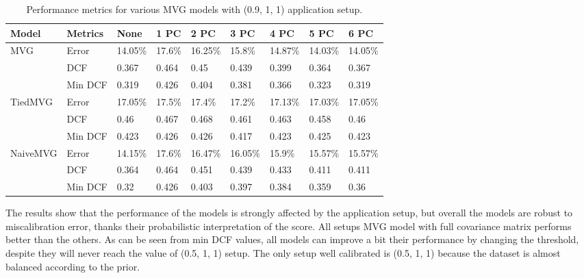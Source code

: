 \documentclass{article}
\begin{document}
\begin{table}[ht]
    \centering
    \begin{tabularx}{\textwidth}{ll*{7}{X}}
        \toprule
        \textbf{Model} & \textbf{Metrics} & \textbf{None} & \textbf{1 PC} & \textbf{2 PC} & \textbf{3 PC} & \textbf{4 PC} & \textbf{5 PC} & \textbf{6 PC} \\
        \midrule
        \multirow{3}{*}{MVG} & Error & 14.05\% & 17.6\% & 16.25\% & 15.8\% & 14.87\% & 14.03\% & 14.05\% \\
                              & DCF & 0.367 & 0.464 & 0.45 & 0.439 & 0.399 & 0.364 & 0.367 \\
                              & Min DCF & 0.319 & 0.426 & 0.404 & 0.381 & 0.366 & 0.323 & 0.319 \\
        \midrule
        \multirow{3}{*}{TiedMVG} & Error & 17.05\% & 17.5\% & 17.4\% & 17.2\% & 17.13\% & 17.03\% & 17.05\% \\
                                 & DCF & 0.46 & 0.467 & 0.468 & 0.461 & 0.463 & 0.458 & 0.46 \\
                                 & Min DCF & 0.423 & 0.426 & 0.426 & 0.417 & 0.423 & 0.425 & 0.423 \\
        \midrule
        \multirow{3}{*}{NaiveMVG} & Error & 14.15\% & 17.6\% & 16.47\% & 16.05\% & 15.9\% & 15.57\% & 15.57\% \\
                                  & DCF & 0.364 & 0.464 & 0.451 & 0.439 & 0.433 & 0.411 & 0.411 \\
                                  & Min DCF & 0.32 & 0.426 & 0.403 & 0.397 & 0.384 & 0.359 & 0.36 \\
        \bottomrule
    \end{tabularx}
    \caption{Performance metrics for various MVG models with (0.9, 1, 1) application setup.}
    \label{tab:mvg_performance_9_1_1}
\end{table}

The results show that the performance of the models is strongly affected by the application setup, but overall the models are robust to miscalibration error, thanks their probabilistic interpretation of the score. All setups MVG model with full covariance matrix performs better than the others. As can be seen from min DCF values, all models can improve a bit their performance by changing the threshold, despite they will never reach the value of (0.5, 1, 1) setup. The only setup well calibrated is (0.5, 1, 1) because the dataset is almost balanced according to the prior.
\end{document}
